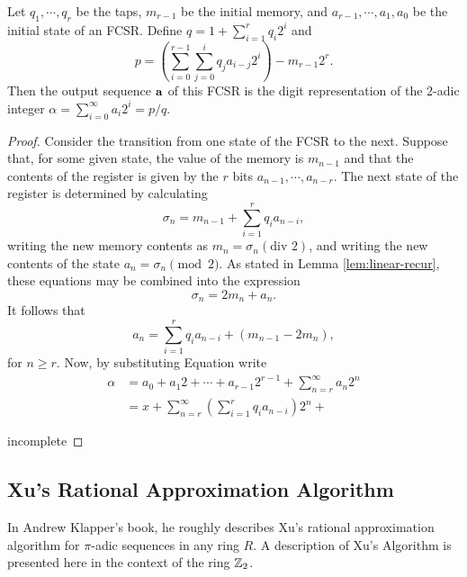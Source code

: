 \begin{proposition}{\rm \cite{art:kg97}}\label{prop:FCSR-seq}
	Let $q_1,\cdots,q_r$ be the taps, $m_{r-1}$ be the initial memory, and
	$a_{r-1},\cdots,a_1,a_0$ be the initial state of an FCSR. Define
	$q=1+\sum_{i=1}^{r}q_i2^i$ and
	\begin{equation}
		p=\left(\sum_{i=0}^{r-1}\sum_{j=0}^iq_ja_{i-j}2^i\right)-m_{r-1}2^r.
	\end{equation}
	Then the output sequence ${\bf a}$ of this FCSR is the digit representation of
	the 2-adic integer $\alpha=\sum_{i=0}^\infty a_i2^i=p/q$.
\end{proposition}
\begin{proof}
	Consider the transition from one state of the FCSR to the next. Suppose that,
	for some given state, the value of the memory is $m_{n-1}$ and that the
	contents of the register is given by the $r$ bits $a_{n-1},\cdots,a_{n-r}$.
	The next state of the register is determined by calculating
	\begin{equation}
		\sigma_n=m_{n-1}+\sum_{i=1}^rq_ia_{n-i},
	\end{equation}
	writing the new memory contents as $m_n=\sigma_n(\text{div }2)$, and writing
	the new contents of the state $a_n=\sigma_n\pmod2$. As stated in Lemma
	\ref{lem:linear-recur}, these equations may be combined into the expression
	\[
		\sigma_n=2m_n+a_n.
	\]
	It follows that
	\begin{equation}
		a_n=\sum_{i=1}^rq_ia_{n-i}+(m_{n-1}-2m_n),
	\end{equation}
	for $n\geq r$. Now, by substituting Equation write
	\begin{align*}
		\alpha&=a_0+a_1 2+\cdots+a_{r-1}2^{r-1}+\sum_{n=r}^\infty a_n2^n\\
		&=x+\sum_{n=r}^\infty\left( \sum_{i=1}^r q_ia_{n-i} \right)2^n+
  \end{align*}

	incomplete

\end{proof}

\subsection{Xu's Rational Approximation Algorithm}
\par In Andrew Klapper's book, he roughly describes Xu's rational approximation
algorithm for $\pi$-adic sequences in any ring $R$. A description of Xu's Algorithm
is presented here in the context of the ring $\mathbb{Z}_2$.

